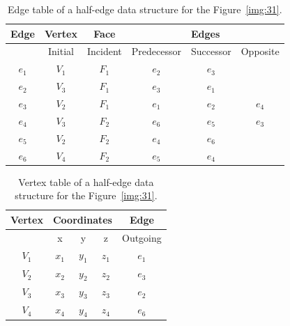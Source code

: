\begin{table}[h!]
    \centering
    \begin{tabular}{|c|c|c|ccc|}
    \hline
    \hline
    Edge  & Vertex       & Face        & \multicolumn{3}{c|}{Edges}                            \\ \hline
          & Initial      & Incident    & Predecessor            & Successor          & Opposite         \\ \hline\hline
    $e_1$ & $V_1$        & $F_1$       & $e_2$            & $e_3$           &                  \\ \hline
    $e_2$ & $V_3$        & $F_1$       & $e_3$            & $e_1$           &                  \\ \hline
    $e_3$ & $V_2$        & $F_1$       & $e_1$            & $e_2$           & $e_4$            \\ \hline
    $e_4$ & $V_3$        & $F_2$       & $e_6$            & $e_5$           & $e_3$            \\ \hline
    $e_5$ & $V_2$        & $F_2$       & $e_4$            & $e_6$           &                  \\ \hline
    $e_6$ & $V_4$        & $F_2$       & $e_5$            & $e_4$           &                  \\ \hline\hline
    
    \end{tabular}
\caption{Edge table of a half-edge data structure for the Figure~\ref{img:31}.}
\label{tab:5}
\end{table}

\begin{table}[h!]
    \centering
    \begin{tabular}{|c|ccc|c|}
    \hline
    \hline
    Vertex  & \multicolumn{3}{c|}{Coordinates}          & Edge            \\ \hline
          & x            & y            & z           & Outgoing   \\ \hline\hline
    $V_1$ & $x_1$        & $y_1$        & $z_1$       & $e_1$           \\ \hline
    $V_2$ & $x_2$        & $y_2$        & $z_2$       & $e_3$           \\ \hline
    $V_3$ & $x_3$        & $y_3$        & $z_3$       & $e_2$           \\ \hline
    $V_4$ & $x_4$        & $y_4$        & $z_4$       & $e_6$           \\ \hline\hline
    \end{tabular}
\caption{Vertex table of a half-edge data structure for the Figure~\ref{img:31}.}
\label{tab:6}
\end{table}

